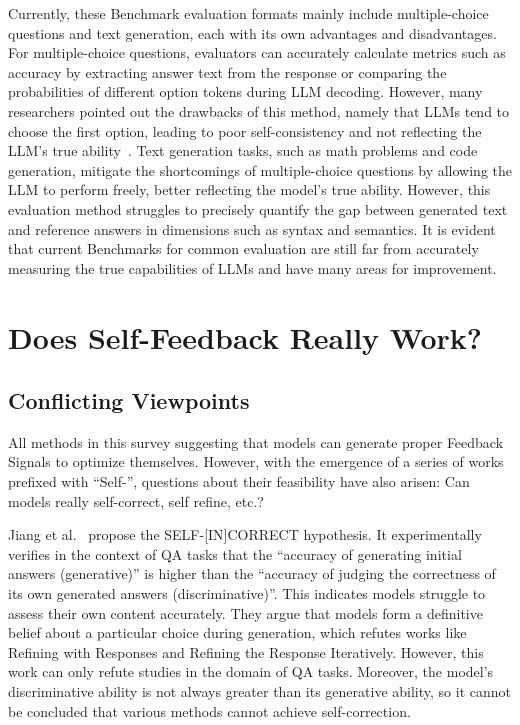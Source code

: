 \documentclass[lettersize,journal]{IEEEtran}
\begin{document}
Currently, these Benchmark evaluation formats mainly include multiple-choice questions and text generation, each with its own advantages and disadvantages. For multiple-choice questions, evaluators can accurately calculate metrics such as accuracy by extracting answer text from the response or comparing the probabilities of different option tokens during LLM decoding. However, many researchers pointed out the drawbacks of this method, namely that LLMs tend to choose the first option, leading to poor self-consistency and not reflecting the LLM's true ability~\cite{FTEvsTOE_24_arxiv_LMU,wang2024answersreviewingrationalitymultiple}. Text generation tasks, such as math problems and code generation, mitigate the shortcomings of multiple-choice questions by allowing the LLM to perform freely, better reflecting the model's true ability. However, this evaluation method struggles to precisely quantify the gap between generated text and reference answers in dimensions such as syntax and semantics. It is evident that current Benchmarks for common evaluation are still far from accurately measuring the true capabilities of LLMs and have many areas for improvement.


\section{Does Self-Feedback Really Work?}  \label{sec:does_it_work}


\subsection{Conflicting Viewpoints} \label{sec:conflict}


\noindent All methods in this survey suggesting that models can generate proper Feedback Signals to optimize themselves. However, with the emergence of a series of works prefixed with ``Self-'', questions about their feasibility have also arisen: Can models really self-correct, self refine, etc.?

Jiang et al.~\cite{SelfIncorrect_24_arXiv_JHU} propose the SELF-[IN]CORRECT hypothesis. It experimentally verifies in the context of QA tasks that the ``accuracy of generating initial answers (generative)'' is higher than the ``accuracy of judging the correctness of its own generated answers (discriminative)''. This indicates models struggle to assess their own content accurately. They argue that models form a definitive belief about a particular choice during generation, which refutes works like Refining with Responses and Refining the Response Iteratively. However, this work can only refute studies in the domain of QA tasks. Moreover, the model's discriminative ability is not always greater than its generative ability, so it cannot be concluded that various methods cannot achieve self-correction.
\end{document}
